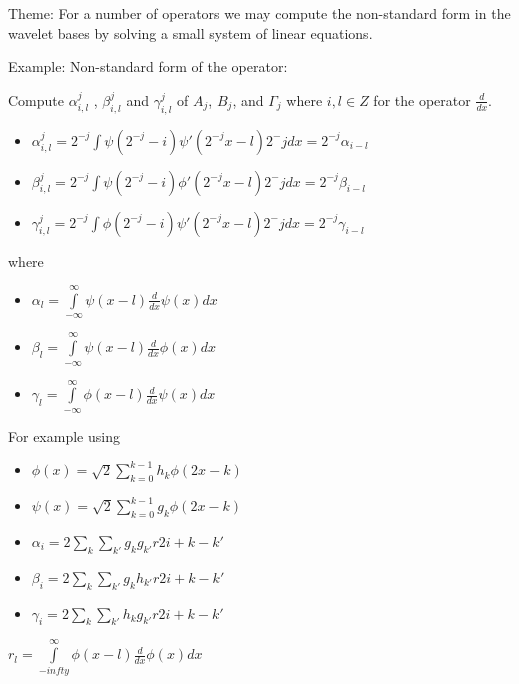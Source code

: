 \documentclass[11pt]{article}
\begin{document}
Theme: For a number of operators we may compute the non-standard form in the wavelet bases by solving a small system of linear equations.  

Example: Non-standard form of the operator:

Compute $\alpha^j _{i,l}$ , $\beta^j _{i,l}$ and $\gamma^j _{i,l}$ of $A_j$, $B_j$, and $\Gamma_j$ where $i,l \in Z$ for the operator $\frac{d}{dx}$.  
\begin{itemize}
\item $\alpha ^j_{i,l} = 2^{-j} \int \psi (2^{-j} - i) \psi\prime (2^{-j}x -l) 2^-j dx = 2^{-j} \alpha_{i-l}  $
\item $\beta ^j_{i,l} = 2^{-j} \int \psi (2^{-j} - i) \phi\prime (2^{-j}x -l) 2^-j dx = 2^{-j} \beta_{i-l}  $
\item $\gamma ^j_{i,l} = 2^{-j} \int \phi (2^{-j} - i) \psi\prime (2^{-j}x -l) 2^-j dx = 2^{-j} \gamma_{i-l}  $
\end{itemize}

where 
\begin{itemize}
\item $\alpha_l = \int\limits ^\infty _{-\infty} \psi (x-l)\frac{d}{dx} \psi (x)dx$
\item $\beta_l = \int\limits ^\infty _{-\infty} \psi (x-l)\frac{d}{dx} \phi (x)dx$
\item $\gamma_l = \int\limits ^\infty _{-\infty} \phi (x-l)\frac{d}{dx} \psi (x)dx$
\end{itemize}

For example using 
\begin{itemize}
\item $\phi(x) = \sqrt{2} \sum\limits^{k-1} _{k=0} h_k \phi(2x-k)$

\item $\psi(x) = \sqrt{2} \sum\limits^{k-1} _ {k=0} g_k \phi (2x-k)$

\item $\alpha_i = 2 \sum\limits_k \sum\limits_{k\prime} g_k g_{k\prime} r{2i + k -k\prime}$

\item $\beta_i = 2 \sum\limits_k \sum\limits_{k\prime} g_k h_{k\prime} r{2i + k -k\prime}$

\item $\gamma_i = 2 \sum\limits_k \sum\limits_{k\prime} h_k g_{k\prime} r{2i + k -k\prime}$
\end{itemize}

$r_l = \int\limits^\infty _{-infty} \phi(x-l) \frac{d}{dx}\phi(x)dx$
\end{document}
